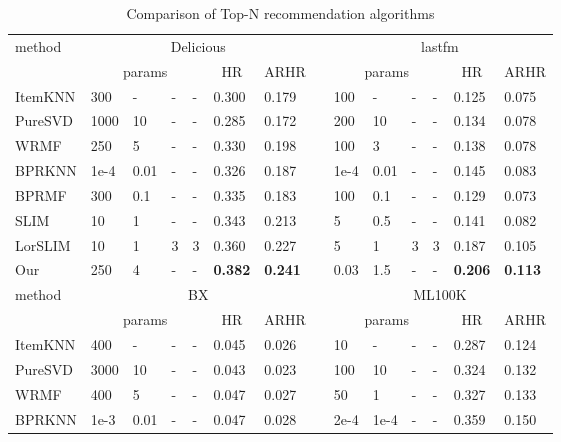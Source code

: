 \documentclass[letterpaper]{article}
\begin{document}
\begin{table}[ht]
\begin{center}
\begin{threeparttable}
%
\caption{Comparison of Top-N recommendation algorithms}
\label{tab:comp}
\tiny
\begin{tabular}{llllllllllllll}
\hline
\multirow{2}{*}{method} &
\multicolumn{6}{c}{Delicious} &
\multicolumn{1}{c}{}&
\multicolumn{6}{c}{lastfm} \\
\cline{2-7} \cline{9-14}
  & \multicolumn{4}{c}{params} &\multicolumn{1}{c}{HR}  & \multicolumn{1}{c}{ARHR} &\multicolumn{1}{c}{}&\multicolumn{4}{c}{params} &\multicolumn{1}{c}{HR}  & \multicolumn{1}{c}{ARHR} \\
\hline
ItemKNN&300&-&-&-&0.300&0.179&&100&-&-&-&0.125&0.075\\
PureSVD&1000&10&-&-&0.285&0.172&&200&10&-&-&0.134&0.078\\
WRMF&250&5&-&-&0.330&0.198&&100&3&-&-&0.138&0.078\\
BPRKNN&1e-4&0.01&-&-&0.326&0.187&&1e-4&0.01&-&-&0.145&0.083\\
BPRMF&300&0.1&-&-&0.335&0.183&&100&0.1&-&-&0.129&0.073\\
SLIM&10&1&-&-&0.343&0.213&&5&0.5&-&-&0.141&0.082\\
LorSLIM&10&1&3&3&0.360&0.227&&5&1&3&3&0.187&0.105\\
Our&250&4&-&-&\bf{0.382}&\bf{0.241}&&0.03&1.5&-&-&\bf{0.206}&\bf{0.113}\\
\hline\hline
\multirow{2}{*}{method} &
\multicolumn{6}{c}{BX} &
\multicolumn{1}{c}{}&
\multicolumn{6}{c}{ML100K} \\
\cline{2-7} \cline{9-14}
  & \multicolumn{4}{c}{params} &\multicolumn{1}{c}{HR}  & \multicolumn{1}{c}{ARHR} &\multicolumn{1}{c}{}&\multicolumn{4}{c}{params} &\multicolumn{1}{c}{HR}  & \multicolumn{1}{c}{ARHR} \\
\hline
ItemKNN&400&-&-&-&0.045&0.026&&10&-&-&-&0.287&0.124\\
PureSVD&3000&10&-&-&0.043&0.023&&100&10&-&-&0.324&0.132\\
WRMF&400&5&-&-&0.047&0.027&&50&1&-&-&0.327&0.133\\
BPRKNN&1e-3&0.01&-&-&0.047&0.028&&2e-4&1e-4&-&-&0.359&0.150\\

\end{tabular}
\end{threeparttable}
\end{center}
\end{table}
\end{document}
